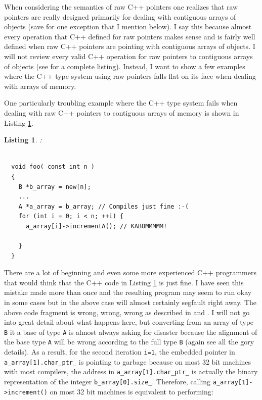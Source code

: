 \documentclass[pdf,ps2pdf,11pt]{SANDreport}
\newtheorem{listing}{Listing}
\begin{document}
When considering the semantics of raw C++ pointers one realizes that
raw pointers are really designed primarily for dealing with contiguous
arrays of objects (save for one exception that I mention below).  I
say this because almost every operation that C++ defined for raw
pointers makes sense and is fairly well defined when raw C++ pointers
are pointing with contiguous arrays of objects.  I will not review
every valid C++ operation for raw pointers to contiguous arrays of
objects (see {}\cite{stroustrup97} for a complete listing).  Instead,
I want to show a few examples where the C++ type system using raw
pointers falls flat on its face when dealing with arrays of memory.

One particularly troubling example where the C++ type system fails
when dealing with raw C++ pointers to contiguous arrays of memory is
shown in Listing {}\ref{listing:BadArrayPointerConversion}.

\begin{listing}:\\
\label{listing:BadArrayPointerConversion}
{\small\begin{verbatim}

  void foo( const int n )
  {
    B *b_array = new[n];
    ...
    A *a_array = b_array; // Compiles just fine :-(
    for (int i = 0; i < n; ++i) {
      a_array[i]->incrementA(); // KABOMMMMM!

    }
  }

\end{verbatim}}
\end{listing}

There are a lot of beginning and even some more experienced C++
programmers that would think that the C++ code in Listing
{}\ref{listing:BadArrayPointerConversion} is just fine.  I have seen
this mistake made more than once and the resulting program may seem to
run okay in some cases but in the above case will almost certainly
segfault right away.  The above code fragment is wrong, wrong, wrong
as described in {}\cite[Gotcha \#33]{C++Gotchas03} and {}\cite[Item
\#100]{C++CodingStandards05}.  I will not go into great detail about
what happens here, but converting from an array of type {}\texttt{B}
it a base of type {}\texttt{A} is almost always asking for disaster
because the alignment of the base type {}\texttt{A} will be wrong
according to the full type {}\texttt{B} (again see {}\cite[Gotcha
\#33]{C++Gotchas03} all the gory details).  As a result, for the
second iteration {}\texttt{i=1}, the embedded pointer in
{}\texttt{a\_array[1].char\_ptr\_} is pointing to garbage because on
most 32 bit machines with most compilers, the address in
{}\texttt{a\_array[1].char\_ptr\_} is actually the binary
representation of the integer {}\texttt{b\_array[0].size\_}.
Therefore, calling {}\texttt{a\_array[1]->increment()} on most 32 bit
machines is equivalent to performing:
\end{document}
